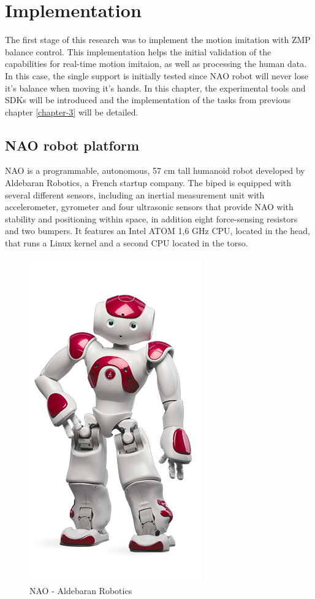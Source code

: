 \chapter{Implementation}

The first stage of this research was to implement the motion imitation with ZMP balance control. This implementation helps the initial validation of the capabilities for real-time motion imitaion, 
as well as processing the human data. In this case, the single support is initially tested since NAO robot will never lose it's balance when moving it's hands. In this chapter, the experimental tools
and SDKs will be introduced and the implementation of the tasks from previous chapter \ref{chapter-3} will be detailed. 


\section{NAO robot platform}


NAO is a programmable, autonomous, 57 cm tall humanoid robot developed by Aldebaran Robotics, a French startup company. The biped is equipped with several
different sensors, including an inertial measurement unit with accelerometer, gyrometer and four ultrasonic sensors that provide NAO with stability and 
positioning within space, in addition eight force-sensing resistors and two bumpers. It features an Intel ATOM 1,6 GHz CPU, located in the head, that runs
 a Linux kernel and a second CPU located in the torso.


\begin{figure}[h!]
    \centering
    \includegraphics[scale=0.55]{images/nao-robot.jpg}\hfill
    \caption{NAO - Aldebaran Robotics \cite{aldebaran-masses}}\hfill
    \label{fig: nao-robot}
\end{figure}

